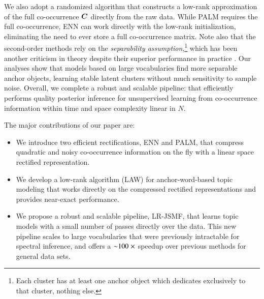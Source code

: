 We also adopt a randomized algorithm that constructs a low-rank approximation of
the full co\hyp{}occurrence $\bm{C}$ directly from the raw data. While PALM
requires the full co\hyp{}occurrence, ENN can work directly with the low-rank
initialization, eliminating the need to ever store a full co\hyp{}occurrence
matrix. Note also that the second-order methods rely on the \textit{separability
assumption},\footnote{Each cluster has at least one anchor object which
dedicates exclusively to that cluster, nothing else.} which has been another
criticism in theory despite their superior performance in practice 
\cite{moontae2017from}. Our analyses show that models based on large
vocabularies find more separable anchor objects, learning stable latent clusters
without much sensitivity to sample noise. Overall, we complete a robust and
scalable pipeline: that efficiently performs quality posterior inference for
unsupervised learning from co\hyp{}occurrence information within time and space
complexity linear in $N$. 

The major contributions of our paper are:
\begin{itemize}[leftmargin=*]
    \item We introduce two efficient rectifications, ENN and PALM, that compress
    quadratic and noisy co-occurrence information on the fly with a linear space
    rectified representation. 
    \item We develop a low-rank algorithm (LAW) for anchor-word-based topic
    modeling that works directly on the compressed rectified representations and
    provides near-exact performance.
    \item We propose a robust and scalable pipeline, LR-JSMF, that learns topic
    models with a small number of passes directly over the data.  This new
    pipeline scales to large vocabularies that were previously intractable for
    spectral inference, and offers a $\mathbf{\sim}100\mathrel{\times}$ speedup over
    previous methods for general data sets.
\end{itemize} 